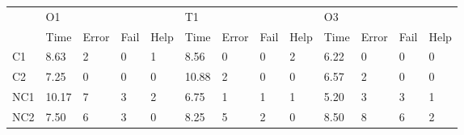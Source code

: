     \begin{table}[ht]
    \begin{tabular}{lllllllllllll}
    \cline{2-13}
    \multicolumn{1}{l|}{}     & \multicolumn{4}{l|}{O1}                                                                                         & \multicolumn{4}{l|}{T1}                                                                                         & \multicolumn{4}{l|}{O3}                                                                                        \\ \cline{2-13} 
    \multicolumn{1}{l|}{}     & \multicolumn{1}{l|}{Time}  & \multicolumn{1}{l|}{Error} & \multicolumn{1}{l|}{Fail} & \multicolumn{1}{l|}{Help} & \multicolumn{1}{l|}{Time}  & \multicolumn{1}{l|}{Error} & \multicolumn{1}{l|}{Fail} & \multicolumn{1}{l|}{Help} & \multicolumn{1}{l|}{Time} & \multicolumn{1}{l|}{Error} & \multicolumn{1}{l|}{Fail} & \multicolumn{1}{l|}{Help} \\ \hline
    \multicolumn{1}{|l|}{C1}  & \multicolumn{1}{l|}{8.63}  & \multicolumn{1}{l|}{2}     & \multicolumn{1}{l|}{0}    & \multicolumn{1}{l|}{1}    & \multicolumn{1}{l|}{8.56}  & \multicolumn{1}{l|}{0}     & \multicolumn{1}{l|}{0}    & \multicolumn{1}{l|}{2}    & \multicolumn{1}{l|}{6.22} & \multicolumn{1}{l|}{0}     & \multicolumn{1}{l|}{0}    & \multicolumn{1}{l|}{0}    \\ \hline
    \multicolumn{1}{|l|}{C2}  & \multicolumn{1}{l|}{7.25}  & \multicolumn{1}{l|}{0}     & \multicolumn{1}{l|}{0}    & \multicolumn{1}{l|}{0}    & \multicolumn{1}{l|}{10.88} & \multicolumn{1}{l|}{2}     & \multicolumn{1}{l|}{0}    & \multicolumn{1}{l|}{0}    & \multicolumn{1}{l|}{6.57} & \multicolumn{1}{l|}{2}     & \multicolumn{1}{l|}{0}    & \multicolumn{1}{l|}{0}    \\ \hline
    \multicolumn{1}{|l|}{NC1} & \multicolumn{1}{l|}{10.17} & \multicolumn{1}{l|}{7}     & \multicolumn{1}{l|}{3}    & \multicolumn{1}{l|}{2}    & \multicolumn{1}{l|}{6.75}  & \multicolumn{1}{l|}{1}     & \multicolumn{1}{l|}{1}    & \multicolumn{1}{l|}{1}    & \multicolumn{1}{l|}{5.20} & \multicolumn{1}{l|}{3}     & \multicolumn{1}{l|}{3}    & \multicolumn{1}{l|}{1}    \\ \hline
    \multicolumn{1}{|l|}{NC2} & \multicolumn{1}{l|}{7.50}  & \multicolumn{1}{l|}{6}     & \multicolumn{1}{l|}{3}    & \multicolumn{1}{l|}{0}    & \multicolumn{1}{l|}{8.25}  & \multicolumn{1}{l|}{5}     & \multicolumn{1}{l|}{2}    & \multicolumn{1}{l|}{0}    & \multicolumn{1}{l|}{8.50} & \multicolumn{1}{l|}{8}     & \multicolumn{1}{l|}{6}    & \multicolumn{1}{l|}{2}    \\ \hline

\end{tabular}
\end{table}
